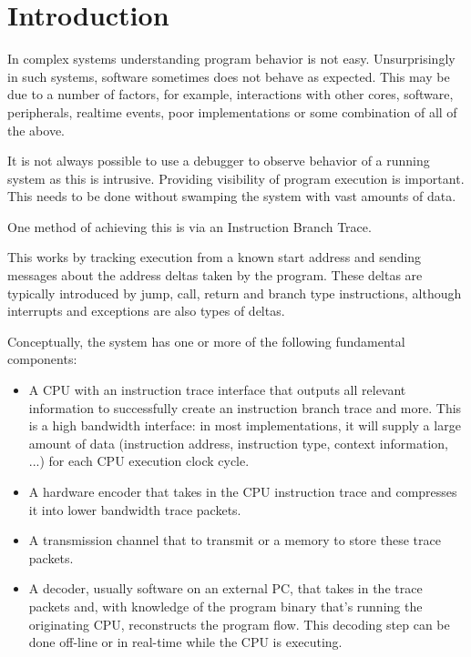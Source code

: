 \chapter{Introduction}
\label{sec:intro}

In complex systems understanding program behavior is not easy.
Unsurprisingly in such systems, software sometimes does not behave as
expected. This may be due to a number of factors, for example,
interactions with other cores, software, peripherals, realtime
events, poor implementations or some combination of all of the above.

It is not always possible to use a debugger to observe behavior of a
running system as this is intrusive.  Providing visibility of program
execution is important.  This needs to be done without swamping the
system with vast amounts of data.

One method of achieving this is via an Instruction Branch Trace.

This works by tracking execution from a known start address and sending
messages about the address deltas taken by the program. These deltas are
typically introduced by jump, call, return and branch type instructions,
although interrupts and exceptions are also types of deltas.

Conceptually, the system has one or more of the following fundamental components:

\begin{itemize}
  \item
    A CPU with an instruction trace interface that outputs all relevant
    information to successfully create an instruction branch trace and more.
    This is a high bandwidth interface: in most implementations, it will supply
    a large amount of data (instruction address, instruction type, context information, ...)
    for each CPU execution clock cycle.
  \item
    A hardware encoder that takes in the CPU instruction trace and compresses
    it into lower bandwidth trace packets.
  \item
    A transmission channel that to transmit or a memory to store
    these trace packets.
  \item
    A decoder, usually software on an external PC, that takes in the trace
    packets and, with knowledge of the program binary that's running the
    originating CPU, reconstructs the program flow. This decoding step can
    be done off-line or in real-time while the CPU is executing.
\end{itemize}

